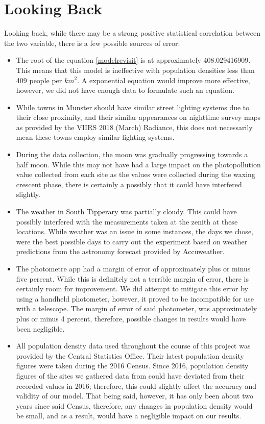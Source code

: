 \section{Looking Back}
Looking back, while there may be a strong positive statistical correlation between the two variable, there is a few possible sources of error:

\begin{itemize}
\item The root of the equation \ref{modelrevisit} is at approximately 408.029416909. This means that this model is ineffective with population densities less than 409 people per $km^{2}$. A exponential equation would improve more effective, however, we did not have enough data to formulate such an equation.

\item While towns in Munster should have similar street lighting systems due to their close proximity, and their similar appearances on nighttime survey maps as provided by the VIIRS 2018 (March) Radiance, this does not necessarily mean these towns employ similar lighting systems.

\item During the data collection, the moon was gradually progressing towards a half moon. While this may not have had a large impact on the photopollution value collected from each site as the values were collected during the waxing crescent phase, there is certainly a possibly that it could have interfered slightly.

\item The weather in South Tipperary was partially cloudy. This could have possibly interfered with the measurements taken at the zenith at these locations. While weather was an issue in some instances, the days we chose, were the best possible days to carry out the experiment based on weather predictions from the astronomy forecast provided by Accuweather. 

\item The photometre app had a margin of error of approximately plus or minus five percent. While this is definitely not a terrible margin of error, there is certainly room for improvement. We did attempt to mitigate this error by using a handheld photometer, however, it proved to be incompatible for use with a telescope. The margin of error of said photometer, was approximately plus or minus 4 percent, therefore, possible changes in results would have been negligible.    

\item All population density data used throughout the course of this project was provided by the Central Statistics Office. Their latest population density figures were taken during the 2016 Census. Since 2016, population density figures of the sites we gathered data from could have deviated from their recorded values in 2016; therefore, this could slightly affect the accuracy and validity of our model. That being said, however, it has only been about two years since said Census, therefore, any changes in population density would be small, and as a result, would have a negligible impact on our results.


\end{itemize}
